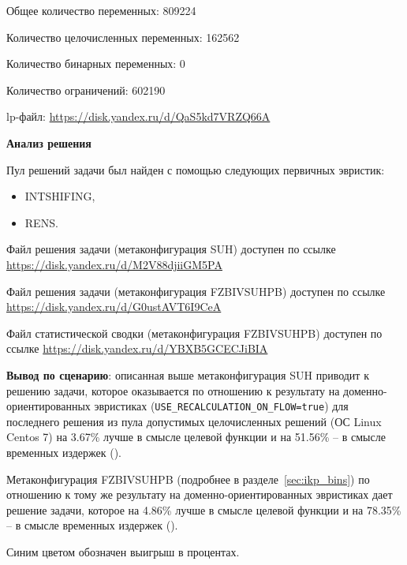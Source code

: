 \documentclass[%
	11pt,
	a4paper,
	utf8,
		]{article}
\begin{document}
Общее количество переменных: 809224

Количество целочисленных переменных: 162562

Количество бинарных переменных: 0

Количество ограничений: 602190

lp-файл: \url{https://disk.yandex.ru/d/QaS5kd7VRZQ66A}

\vspace*{5mm}\textbf{Анализ решения}\vspace*{1mm}

Пул решений задачи был найден с помощью следующих первичных эвристик:
\begin{itemize}
	\item INTSHIFING,
	
	\item RENS.
\end{itemize}

Файл решения задачи (метаконфигурация SUH) доступен по ссылке \url{https://disk.yandex.ru/d/M2V88djiiGM5PA}

Файл решения задачи (метаконфигурация FZBIVSUHPB) доступен по ссылке \url{https://disk.yandex.ru/d/G0ustAVT6I9CeA}

Файл статистической сводки (метаконфигурация FZBIVSUHPB) доступен по ссылке \url{https://disk.yandex.ru/d/YBXB5GCECJiBIA}

\vspace*{3mm}
\textbf{Вывод по сценарию}: описанная выше метаконфигурация SUH приводит к решению задачи, которое оказывается по отношению к результату на доменно-ориентированных эвристиках (\verb|USE_RECALCULATION_ON_FLOW=true|) для последнего решения из пула допустимых целочисленных решений (ОС Linux Centos 7) на 3.67\% лучше в смысле целевой функции и на 51.56\% -- в смысле временных издержек ().

Метаконфигурация FZBIVSUHPB (подробнее в разделе~\ref{sec:ikp_bins}) по отношению к тому же результату на доменно-ориентированных эвристиках дает решение задачи, которое на 4.86\% лучше в смысле целевой функции и на 78.35\% -- в смысле временных издержек ().

Синим цветом обозначен выигрыш в процентах.
\end{document}
